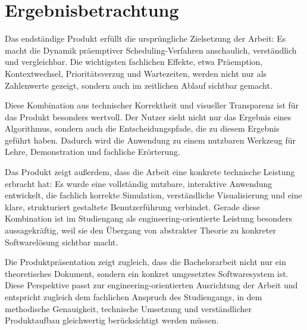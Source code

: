 \section{Ergebnisbetrachtung}

Das endständige Produkt erfüllt die ursprüngliche Zielsetzung der Arbeit: Es macht die Dynamik präemptiver Scheduling-Verfahren anschaulich, verständlich und vergleichbar. Die wichtigsten fachlichen Effekte, etwa Präemption, Kontextwechsel, Prioritätsverzug und Wartezeiten, werden nicht nur als Zahlenwerte gezeigt, sondern auch im zeitlichen Ablauf sichtbar gemacht.

Diese Kombination aus technischer Korrektheit und visueller Transparenz ist für das Produkt besonders wertvoll. Der Nutzer sieht nicht nur das Ergebnis eines Algorithmus, sondern auch die Entscheidungspfade, die zu diesem Ergebnis geführt haben. Dadurch wird die Anwendung zu einem nutzbaren Werkzeug für Lehre, Demonstration und fachliche Erörterung.

Das Produkt zeigt außerdem, dass die Arbeit eine konkrete technische Leistung erbracht hat: Es wurde eine vollständig nutzbare, interaktive Anwendung entwickelt, die fachlich korrekte Simulation, verständliche Visualisierung und eine klare, strukturiert gestaltete Benutzerführung verbindet. Gerade diese Kombination ist im Studiengang als engineering-orientierte Leistung besonders aussagekräftig, weil sie den Übergang von abstrakter Theorie zu konkreter Softwarelösung sichtbar macht.

Die Produktpräsentation zeigt zugleich, dass die Bachelorarbeit nicht nur ein theoretisches Dokument, sondern ein konkret umgesetztes Softwaresystem ist. Diese Perspektive passt zur engineering-orientierten Ausrichtung der Arbeit und entspricht zugleich dem fachlichen Anspruch des Studiengangs, in dem methodische Genauigkeit, technische Umsetzung und verständlicher Produktaufbau gleichwertig berücksichtigt werden müssen.
